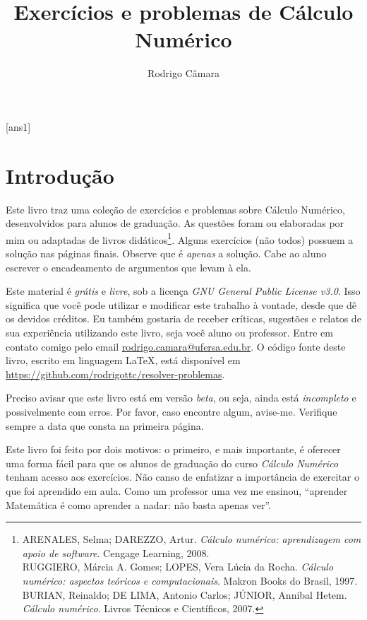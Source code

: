 \documentclass[10pt,a4paper]{report}
\author{Rodrigo Câmara}
\title{Exercícios e problemas de Cálculo Numérico}
\theoremstyle{definition}
\begin{document}
\frenchspacing

\maketitle
\tableofcontents
{}[ans1]
\chapter*{Introdução}

Este livro traz uma coleção de exercícios e problemas sobre Cálculo Numérico, desenvolvidos para alunos de graduação. As questões foram ou elaboradas por mim ou adaptadas de livros didáticos\footnote{ARENALES, Selma; DAREZZO, Artur. \emph{Cálculo numérico: aprendizagem com apoio de software}. Cengage Learning, 2008.\\ RUGGIERO, Márcia A. Gomes; LOPES, Vera Lúcia da Rocha. \emph{Cálculo numérico: aspectos teóricos e computacionais}. Makron Books do Brasil, 1997.\\ BURIAN, Reinaldo; DE LIMA, Antonio Carlos; JÚNIOR, Annibal Hetem. \emph{Cálculo numérico}. Livros Técnicos e Científicos, 2007.}. Alguns exercícios (não todos) possuem a solução nas páginas finais. Observe que é \emph{apenas} a solução. Cabe ao aluno escrever o encadeamento de argumentos que levam à ela.

Este material é \emph{grátis} e \emph{livre}, sob a licença \emph{GNU General Public License v3.0}. Isso significa que você pode utilizar e modificar este trabalho à vontade, desde que dê os devidos créditos. Eu também gostaria de receber críticas, sugestões e relatos de sua experiência utilizando este livro, seja você aluno ou professor. Entre em contato comigo pelo email \url{rodrigo.camara@ufersa.edu.br}. O código fonte deste livro, escrito em linguagem \LaTeX, está disponível em \url{https://github.com/rodrigottc/resolver-problemas}.

Preciso avisar que este livro está em versão \emph{beta}, ou seja, ainda está \emph{incompleto} e possivelmente com erros. Por favor, caso encontre algum, avise-me. Verifique sempre a data que consta na primeira página.


Este livro foi feito por dois motivos: o primeiro, e mais importante, é oferecer uma forma fácil para que os alunos de graduação do curso \emph{Cálculo Numérico} tenham acesso aos exercícios. Não canso de enfatizar a importância de exercitar o que foi aprendido em aula. Como um professor uma vez me ensinou, ``aprender Matemática é como aprender a nadar: não basta apenas ver''. 
\end{document}
